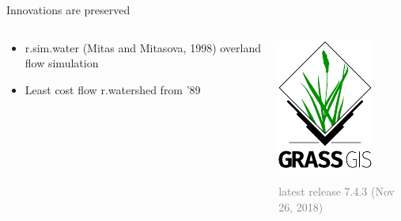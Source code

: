 \documentclass[xcolor={dvipsnames,usenames},beamer,aspectratio=169]{beamer}
\begin{document}
\begin{frame}{Innovations are preserved}

\begin{columns}
\begin{column}{0.6\textwidth}

\begin{itemize}
  \item r.sim.water (Mitas and Mitasova, 1998) overland flow simulation
  \item Least cost flow r.watershed from ’89
\end{itemize}

\end{column}
\begin{column}{0.3\textwidth}

\begin{center}
  \includegraphics[width=\textwidth]{logos/grass_gis}
\end{center}

\vspace*{-1ex}

\textcolor{gray}{
\footnotesize
latest release 7.4.3
\scriptsize
(Nov 26, 2018)
}

\end{column}
\end{columns}

\end{frame}
\end{document}
